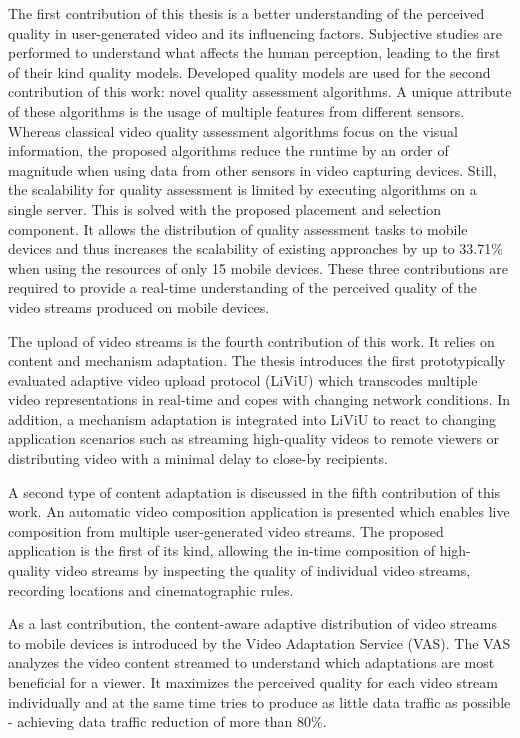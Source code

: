 	The first contribution of this thesis is a better understanding of the perceived quality in user-generated video and its influencing factors.
	Subjective studies are performed to understand what affects the human perception, leading to the first of their kind quality models.
	Developed quality models are used for the second contribution of this work: novel quality assessment algorithms.
	A unique attribute of these algorithms is the usage of multiple features from different sensors. 
	Whereas classical video quality assessment algorithms focus on the visual information, the proposed algorithms reduce the runtime by an order of magnitude when using data from other sensors in video capturing devices.
	Still, the scalability for quality assessment is limited by executing algorithms on a single server. This is solved with the proposed placement and selection component.
	It allows the distribution of quality assessment tasks to mobile devices and thus increases the scalability of existing approaches by up to 33.71\% when using the resources of only 15 mobile devices.
	These three contributions are required to provide a real-time understanding of the perceived quality of the video streams produced on mobile devices.
	
	The upload of video streams is the fourth contribution of this work. It relies on content and mechanism adaptation.
	The thesis introduces the first prototypically evaluated adaptive video upload protocol (LiViU) which transcodes multiple video representations in real-time and copes with changing network conditions.
	In addition, a mechanism adaptation is integrated into LiViU to react to changing application scenarios such as streaming high-quality videos to remote viewers or distributing video with a minimal delay to close-by recipients.
	
	A second type of content adaptation is discussed in the fifth contribution of this work. An automatic video composition application is presented which enables live composition from multiple user-generated video streams.
	The proposed application is the first of its kind, allowing the in-time composition of high-quality video streams by inspecting the quality of individual video streams, recording locations and cinematographic rules.
	
	As a last contribution, the content-aware adaptive distribution of video streams to mobile devices is introduced by the Video Adaptation Service (VAS).
	The VAS analyzes the video content streamed to understand which adaptations are most beneficial for a viewer.
	It maximizes the perceived quality for each video stream individually and at the same time tries to produce as little data traffic as possible - achieving data traffic reduction of more than 80\%. 
	
